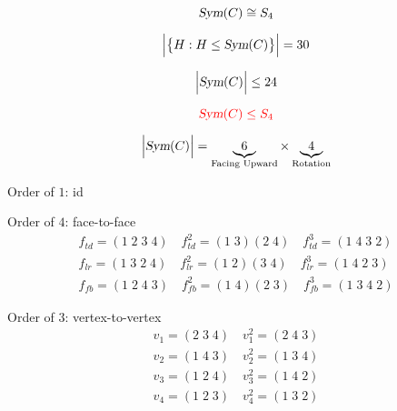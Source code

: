 
\begin{frame}{}

  \[
	\textsl{Sym}(C) \cong S_4
  \]

  \pause
  \vspace{-0.30cm}
  \[
	\Big\lvert \big\{H: H \le \textsl{Sym}(C)\big\} \Big\rvert = 30
  \]
\end{frame}

\begin{frame}{}
  \[
	\Big\lvert \textsl{Sym}(C) \Big\rvert \le 24
  \]

  \pause
  \[
	\textcolor{red}{\textsl{Sym}(C) \le S_4}
  \]

  \pause
  \[
	\Big\lvert \textsl{Sym}(C) \Big\rvert = \underbrace{6}_{\text{Facing Upward}} \times \underbrace{4}_{\text{Rotation}}
  \]
\end{frame}

\begin{frame}{}

  \begin{center}
	Order of $1$: id  \\[6pt]


	\pause
	Order of $4$: face-to-face 
	\begin{align*} 
	  f_{td} = (1\;2\;3\;4) \quad f_{td}^{2} = (1\;3) (2\;4) \quad f_{td}^{3} = (1\;4\;3\;2) \\
	  f_{lr} = (1\;3\;2\;4) \quad f_{lr}^{2} = (1\;2) (3\;4) \quad f_{lr}^{3} = (1\;4\;2\;3) \\
	  f_{fb} = (1\;2\;4\;3) \quad f_{fb}^{2} = (1\;4) (2\;3) \quad f_{fb}^{3} = (1\;3\;4\;2)
	\end{align*}
  \end{center}
\end{frame}

\begin{frame}{}

  \begin{center}
	Order of $3$: vertex-to-vertex 
	\begin{align*}
	  v_{1} = (2\;3\;4) \quad v_{1}^{2} = (2\;4\;3) \\
	  v_{2} = (1\;4\;3) \quad v_{2}^{2} = (1\;3\;4) \\
	  v_{3} = (1\;2\;4) \quad v_{3}^{2} = (1\;4\;2) \\
	  v_{4} = (1\;2\;3) \quad v_{4}^{2} = (1\;3\;2) \\
	\end{align*}
	\end{center}
\end{frame}

